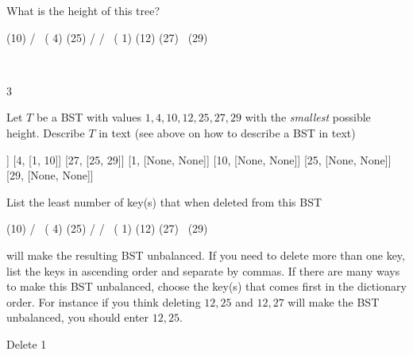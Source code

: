 \nextq
What is the height of this tree?
\begin{console}[fontsize=\footnotesize]
            (10)
          /      \
      ( 4)        (25)
     /           /    \
 ( 1)        (12)      (27)
                           \
                            (29)
\end{console}
\\
\ANSWER
\begin{answercode}
3
\end{answercode}

\nextq
Let $T$ be a BST with values $1, 4, 10, 12, 25, 27, 29$ with the
\textit{smallest} possible height.
Describe $T$ in text (see above on how to describe a BST in text)
\\
\ANSWER
\begin{answercode}
[12, [4, 27]]
[4, [1, 10]]
[27, [25, 29]]
[1, [None, None]]
[10, [None, None]]
[25, [None, None]]
[29, [None, None]]
\end{answercode}

\nextq
List the least number of key(s) that when deleted from this BST
\begin{console}[fontsize=\footnotesize]
            (10)
          /      \
      ( 4)        (25)
     /           /    \
 ( 1)        (12)      (27)
                           \
                            (29)
\end{console}
will make the resulting BST unbalanced.
If you need to delete more than one key, list the keys in ascending order
and separate by commas.
If there are many ways to make this BST unbalanced,
choose the key(s) that comes first in the dictionary order.
For instance if you think deleting $12, 25$ and $12, 27$ will make the
BST unbalanced, you should enter $12, 25$.
\\
\ANSWER
\begin{answercode}
Delete 1
\end{answercode}


